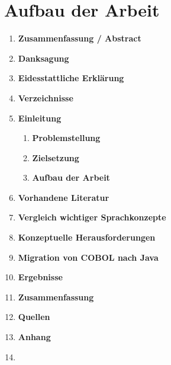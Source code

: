 \section{Aufbau der Arbeit}

\begin{framed}
\begin{enumerate}[label=\arabic*.]
    \item[] \textbf{Zusammenfassung / Abstract}

    \item[] \textbf{Danksagung}

    \item[] \textbf{Eidesstattliche Erklärung}

    \item[] \textbf{Verzeichnisse}

    \item   \textbf{Einleitung}      
        \begin{enumerate}[label=\arabic*.]
            \item \textbf{Problemstellung}
            \item \textbf{Zielsetzung}
            \item \textbf{Aufbau der Arbeit}
        \end{enumerate}

    \item   \textbf{Vorhandene Literatur}
    
    \item   \textbf{Vergleich wichtiger Sprachkonzepte}
    
    \item   \textbf{Konzeptuelle Herausforderungen}

    \item   \textbf{Migration von COBOL nach Java}
    
    \item   \textbf{Ergebnisse}
    
    \item   \textbf{Zusammenfassung}
    
    \item[] \textbf{Quellen}
    
    \item[] \textbf{Anhang}
    
    \item[]
\end{enumerate}
\end{framed}